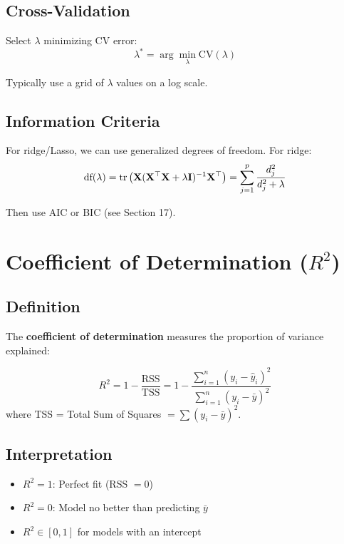\documentclass[main.tex]{subfiles}
\begin{document}
\subsection{Cross-Validation}

Select $\lambda$ minimizing CV error:
$$\lambda^* = \arg\min_\lambda \text{CV}(\lambda)$$

Typically use a grid of $\lambda$ values on a log scale.

\subsection{Information Criteria}

For ridge/Lasso, we can use generalized degrees of freedom. For ridge:
$$\text{df}(\lambda) = \text{tr}\left(\mathbf{X}(\mathbf{X}^\top\mathbf{X} + \lambda\mathbf{I})^{-1}\mathbf{X}^\top\right) = \sum_{j=1}^{p}\frac{d_j^2}{d_j^2 + \lambda}$$

Then use AIC or BIC (see Section 17).

\needspace{0.33\textheight}
\section{Coefficient of Determination ($R^2$)}

\subsection{Definition}

The \textbf{coefficient of determination} measures the proportion of variance explained:

\begin{definition}
$$R^2 = 1 - \frac{\text{RSS}}{\text{TSS}} = 1 - \frac{\sum_{i=1}^{n}(y_i - \hat{y}_i)^2}{\sum_{i=1}^{n}(y_i - \bar{y})^2}$$
where TSS = Total Sum of Squares $= \sum(y_i - \bar{y})^2$.
\end{definition}

\subsection{Interpretation}

\begin{itemize}
    \item $R^2 = 1$: Perfect fit (RSS $= 0$)
    \item $R^2 = 0$: Model no better than predicting $\bar{y}$
    \item $R^2 \in [0, 1]$ for models with an intercept
\end{itemize}
\end{document}
